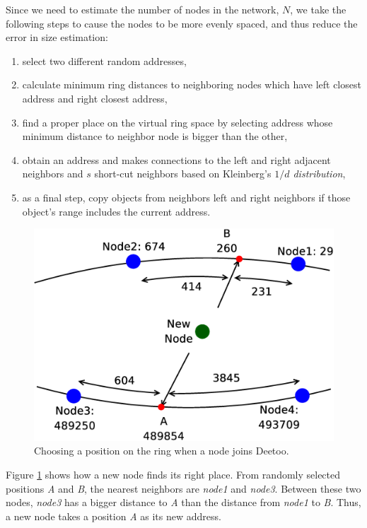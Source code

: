 \documentclass[9.5pt,journal,final,finalsubmission,twocolumn]{IEEEtran}
\begin{document}
Since we need to estimate the number of nodes in the network, $N$,
we take the following steps to cause the nodes to be more evenly spaced,
and thus reduce the error in size estimation:
\begin{enumerate}
\item select two different random addresses, 
\item calculate minimum ring distances to neighboring nodes which have left closest address
	and right closest address,
\item find a proper place on the
virtual ring space by selecting address whose minimum distance to neighbor node 
is bigger than the other,
\item obtain an address and makes connections to the left and right adjacent
neighbors and $s$ short-cut neighbors based on Kleinberg's
\emph{$1/d$ distribution}, 
\item as a final step, copy objects
from neighbors left and right neighbors if those object's range includes the current
address. 
\end{enumerate}
\begin{figure}
\centering
\includegraphics[width=3 in]{evenNet}
\caption{Choosing a position on the ring when a node joins Deetoo.} \label{fig:join}
\end{figure}
Figure \ref{fig:join} shows how a new node finds its right place.
From randomly selected positions \emph{A} and \emph{B}, the nearest neighbors are 
\emph{node1} and \emph{node3}. Between these two nodes, 
\emph{node3} has a bigger distance to \emph{A} than the distance 
from \emph{node1} to \emph {B}. Thus, a new node takes a position \emph{A} as 
its new address. 
\end{document}
